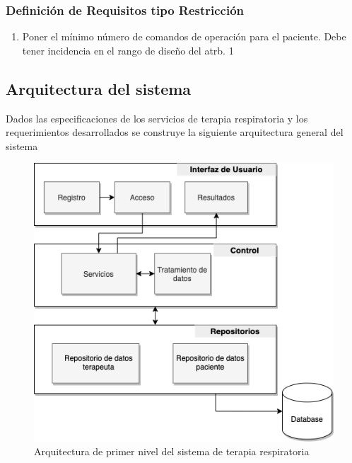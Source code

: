 \documentclass[12pt]{article}
\begin{document}
\subsubsection{Definición de Requisitos tipo Restricción}

\begin{enumerate}[start=1,label={\bfseries RTR\arabic*.}]

\item Poner el mínimo número de comandos de operación para el paciente. Debe tener incidencia en el rango de diseño del atrb. 1


\end{enumerate}






\newpage


\subsection{Arquitectura del sistema}


Dados las especificaciones de los servicios de terapia respiratoria y los requerimientos desarrollados se construye la siguiente arquitectura general del sistema

\begin{figure}[ht]
\centering
\includegraphics[scale=0.45]{imag/C4-Sistema.png}
\caption{Arquitectura de primer nivel del sistema de terapia respiratoria}
\label{5}
\end{figure}
\FloatBarrier
\end{document}

